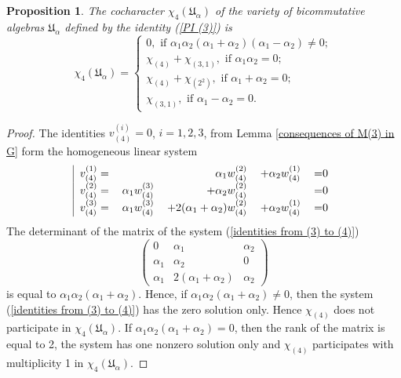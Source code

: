 \documentclass{amsart}
\newtheorem{proposition}[theorem]{Proposition}
\theoremstyle{definition}
\begin{document}
\begin{proposition}\label{chi4 for (3)}
The cocharacter $\chi_4({\mathfrak U}_{\alpha})$ of the variety of bicommutative algebras ${\mathfrak U}_{\alpha}$ defined by the identity {\rm (\ref{PI (3)})} is
\[
\chi_4({\mathfrak U}_{\alpha})=\begin{cases}
0,\text{ if }\alpha_1\alpha_2(\alpha_1+\alpha_2)(\alpha_1-\alpha_2)\not=0;\\
\chi_{(4)}+\chi_{(3,1)},\text{ if }\alpha_1\alpha_2=0;\\
\chi_{(4)}+\chi_{(2^2)},\text{ if }\alpha_1+\alpha_2=0;\\
\chi_{(3,1)}, \text{ if }\alpha_1-\alpha_2=0.
\end{cases}
\]
\end{proposition}

\begin{proof}
The identities $v^{(i)}_{(4)}=0$, $i=1,2,3$, from Lemma \ref{consequences of M(3) in G} form the homogeneous linear system
\begin{equation}
\text{
\begin{tabular}{|rrrrl}\label{identities from (3) to (4)}
$v^{(1)}_{(4)}=$&&$\alpha_1w_{(4)}^{(2)}$&$+\alpha_2w_{(4)}^{(1)}$&=0\\
$v^{(2)}_{(4)}=$&$\alpha_1w_{(4)}^{(3)}$&$+\alpha_2w_{(4)}^{(2)}$&&=0\\
$v^{(3)}_{(4)}=$&$\alpha_1w_{(4)}^{(3)}$&$+2(\alpha_1+\alpha_2)w_{(4)}^{(2)}$&$+\alpha_2w_{(4)}^{(1)}$&=0\\
\end{tabular}
}
\end{equation}
The determinant of the matrix of the system (\ref{identities from (3) to (4)})
\[
\left(\begin{matrix}
0&\alpha_1&\alpha_2\\
\alpha_1&\alpha_2&0\\
\alpha_1&2(\alpha_1+\alpha_2)&\alpha_2
\end{matrix}\right)
\]
is equal to $\alpha_1\alpha_2(\alpha_1+\alpha_2)$. Hence, if $\alpha_1\alpha_2(\alpha_1+\alpha_2)\not=0$, then the system
(\ref{identities from (3) to (4)}) has the zero solution only. Hence $\chi_{(4)}$ does not participate in $\chi_4({\mathfrak U}_{\alpha})$.
If $\alpha_1\alpha_2(\alpha_1+\alpha_2)=0$, then the rank of the matrix is equal to 2, the system has one nonzero solution only
and $\chi_{(4)}$ participates with multiplicity 1 in $\chi_4({\mathfrak U}_{\alpha})$.


\end{proof}
\end{document}
